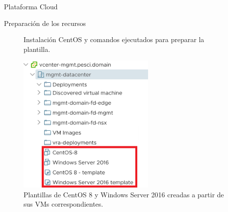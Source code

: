 \begin{subsection}{Plataforma Cloud}
\begin{subsubsection}{Preparación de los recursos}
\begin{figure}[h]
        \caption{Instalación CentOS y comandos ejecutados para preparar la plantilla.}
        \label{fig:centos-installing}
    \end{figure}
    \FloatBarrier
    \begin{figure}[h]
        \centering
        \includegraphics[width=0.6\textwidth]{imaxes/pruebaconcepto/vrealize/plantillas-creadas-vcenter.png}
        \caption{Plantillas de CentOS 8 y Windows Server 2016 creadas a partir de sus VMs correspondientes.}
        \label{fig:templates}
    \end{figure}
    \FloatBarrier

    \end{subsubsection}


\end{subsection}
